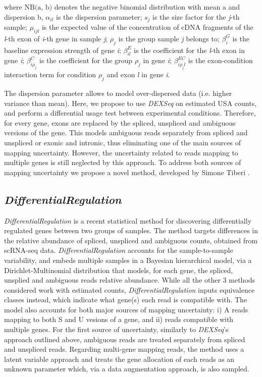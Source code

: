 where $\text{NB(a, b)}$ denotes the negative binomial distribution with mean a and dispersion b, $\alpha_{il}$ is the dispersion parameter; $s_j$ is the size factor for the \emph{j}-th sample; $\mu_{ijl}$ is the expected value of the concentration of cDNA fragments of the \emph{l}-th exon of \emph{i}-th gene in sample \emph{j}; $\rho_j$ is the group sample \emph{j} belongs to; $\beta^G_i$ is the baseline expression strength of gene \emph{i}; $\beta^E_{il}$ is the coefficient for the \emph{l}-th exon in gene \emph{i}; $\beta^C_{i\rho_j}$ is the coefficient for the group $\rho_j$ in gene \emph{i}; $\beta^{EC}_{i \rho_j l}$ is the exon-condition interaction term for condition $\rho_j$ and exon \emph{l} in gene \emph{i}.

The dispersion parameter allows to model over-dispersed data (i.e. higher variance than mean). Here, we propose to use \emph{DEXSeq} on estimated USA counts, and perform a differential usage test between experimental conditions. Therefore, for every gene, exons are replaced by the spliced, unspliced and ambiguous versions of the gene. This models ambiguous reads separately from spliced and unspliced or exonic and intronic, thus eliminating one of the main sources of mapping uncertainty. However, the uncertainty related to reads mapping to multiple genes is still neglected by this approach. To address both sources of mapping uncertainty we propose a novel method, developed by Simone Tiberi \citep{differential_regulation}.

\subsection{\emph{DifferentialRegulation}}
\emph{DifferentialRegulation} is a recent statistical method for discovering differentially regulated genes between two groups of samples. The method targets differences in the relative abundance of spliced, unspliced and ambiguous counts, obtained from scRNA-seq data. \emph{DifferentialRegulation} accounts for the sample-to-sample variability, and embeds multiple samples in a Bayesian hierarchical model, via a Dirichlet-Multinomial distribution that models, for each gene, the spliced, unsplied and ambiguous reads relative abundance. While all the other 3 methods considered work with estimated counts, \emph{DifferentialRegulation} inputs equivalence classes instead, which indicate what gene(s) each read is compatible with.
The model also accounts for both major sources of mapping uncertainty: i) A reads mapping to both S and U vesions of a gene, and ii) reads compatible with multiple genes. For the first source of uncertainty, similarly to \emph{DEXSeq}'s approach outlined above, ambiguous reads are treated separately from spliced and unspliced reads. Regarding multi-gene mapping reads, the method uses a latent variable approach and treats the gene allocation of each reads as an unknown parameter which, via a data augmentation approach, is also sampled.

